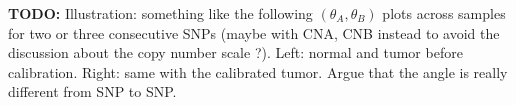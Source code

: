 \documentclass[10pt]{bmc_article}
\newenvironment{bmcformat}{\fussy\setboolean{publ}{true}}{\fussy}
\newenvironment{TODO}{\color{red}\textbf{TODO:}}{}
\begin{document}
\begin{bmcformat}
\begin{TODO}
  Illustration: something like the following $(\theta_A,\theta_B)$ plots across samples for two or three consecutive SNPs (maybe with CNA, CNB instead to avoid the discussion about the copy number scale ?).
 Left: normal and tumor before calibration. Right: same with the calibrated tumor. Argue that the angle is really different from SNP to SNP. 
\end{TODO}


\end{bmcformat}
\end{document}
